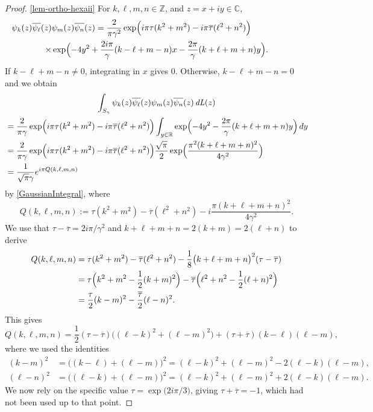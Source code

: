 \documentclass[JEP,XML,SOM,Unicode,NoFloatCountersInSection,published]{cedram}
\DeclareMathOperator{\dL}{\mathit{dL}}
\theoremstyle{definition}
\let\EE\exp
\let\ov\overline
\newcommand\C{\mathbb C}
\newcommand\R{\mathbb R}
\newcommand\Z{\mathbb Z}
\newcommand{\pa}[1]{\left(#1\right)}
\begin{document}
\begin{proof}
\eqref{lem-ortho-hexaii} For $k,\ell,m,n \in \Z$, and $z=x+iy \in \C$,
\begin{multline*}
\psi_{k}(z)\ov{\psi_{\ell}}(z)\psi_{m}(z)\ov{\psi_{n}}(z)=\frac{2}{\pi \gamma^2} \EE\Bigl({i\pi\tau (k^2+m^2)-i\pi\overline{\tau}(\ell^2+n^2)}\Bigr) \qquad \qquad \qquad \\
\times \EE\Bigl({-4y^2+\frac{2i\pi}{\gamma}(k-\ell+m-n)x-\frac{2\pi}{\gamma}(k+\ell+m+n)y}\Bigr).
\end{multline*}
If $k-\ell+m-n \neq 0$, integrating in $x$ gives $0$. Otherwise, $k-\ell+m-n = 0$ and we obtain
\begin{multline*}
\int_{S_{\gamma}} \psi_{k}(z)\ov{\psi_{\ell}}(z) \psi_{m}(z)\ov{\psi_{n}}(z) \dL(z)\\
\begin{aligned}
&=\frac{2}{\pi \gamma} \EE\Bigl(i\pi\tau (k^2+m^2)-i\pi\overline{\tau}(\ell^2+n^2) \Bigr) \int_{y\in\R} \EE\Bigl(-4y^2-\frac{2\pi}{\gamma}(k+\ell+m+n)y \Bigr)\,dy \\
&= \frac{2}{\pi \gamma} \EE\Bigl({i\pi\tau (k^2+m^2)-i\pi\overline{\tau}(\ell^2+n^2)} \Bigr) \frac{\sqrt{\pi}}{2} \EE\Bigl({\frac{\pi^2(k+\ell+m+n)^2}{4\gamma^2}} \Bigr) \\
&= \frac{1}{\sqrt{\pi}\gamma}e^{i\pi Q(k,\ell,m,n)}
\end{aligned}
\end{multline*}
by \eqref{GaussianIntegral}, where
\[
Q(k,\ell,m,n):= \tau (k^2+m^2) - \overline{\tau}(\ell^2+n^2) -i \dfrac{\pi(k+\ell+m+n)^2}{4\gamma^2}.
\]
We use that $\tau - \ov{\tau} = 2i {\pi}/{\gamma^2}$ and $k+\ell+m+n = 2(k+m) = 2(\ell+n)$ to derive
\begin{align*}
Q(k,\ell,m,n) &= \tau (k^2+m^2) - \overline{\tau}(\ell^2+n^2) - \frac{1}{8}\bigl(k+\ell+m+n\bigr)^2(\tau-\ov{\tau})\\
&= \tau\Bigl({k^2+m^2-\frac12(k+m)^2}\Bigr) - \ov{\tau}\Bigl({\ell^2+n^2-\frac12(\ell+n)^2} \Bigr)\\
&= \frac{\tau}{2}(k-m)^2 - \frac{\ov{\tau}}{2}(\ell-n)^2.
\end{align*}
This gives
\begin{equation}\label{proj_4psi_general}
Q(k,\ell,m,n) = \frac{1}{2}(\tau-\ov{\tau})\bigl({(\ell-k)^2 + (\ell-m)^2}\bigr) + \pa{\tau+\ov{\tau}}(k-\ell)(\ell-m),
\end{equation}
where we used the identities
\begin{align*}
(k-m)^2 &= \bigl((k-\ell)+(\ell-m)\bigr)^2 = (\ell-k)^2 + (\ell-m)^2 -2(\ell-k)(\ell-m), \\
(\ell-n)^2 &= \bigl((\ell-k)+(\ell-m)\bigr)^2 = (\ell-k)^2 + (\ell-m)^2 +2(\ell-k)(\ell-m).
\end{align*}
We now rely on the specific value $\tau = \EE\bigl({{2i\pi}/{3}}\bigr)$, giving $\tau + \ov{\tau} = -1$, which had not been used up to that point.


\end{proof}
\end{document}
